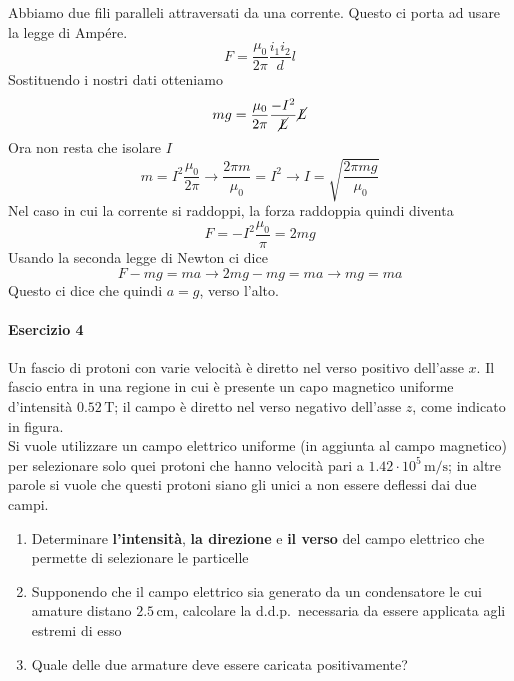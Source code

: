 Abbiamo due fili paralleli attraversati da una corrente. Questo ci porta ad usare la legge di Ampére.
\begin{equation*}
F = \frac{\mu_0}{2\pi}\frac{i_1i_2}{d}l
\end{equation*}
Sostituendo i nostri dati otteniamo
\begin{equation*}
mg = \frac{\mu_0}{2\pi}\frac{-I^2}{\cancel{L}}\cancel{L}
\end{equation*}
Ora non resta che isolare $I$
\begin{equation*}
m=I^2\frac{\mu_0}{2\pi} \rightarrow \frac{2\pi m}{\mu_0}=I^2 \rightarrow 
\boxed{I = \sqrt{\frac{2\pi mg}{\mu_0}}}
\end{equation*}
Nel caso in cui la corrente si raddoppi, la forza raddoppia quindi diventa
\begin{equation*}
F=-I^2\frac{\mu_0}{\pi}=2mg
\end{equation*}
Usando la seconda legge di Newton ci dice
\begin{equation*}
F-mg=ma\rightarrow 2mg-mg = ma \rightarrow mg=ma
\end{equation*}
Questo ci dice che quindi $\boxed{a = g}$, verso l'alto.

\paragraph{Esercizio 4}
Un fascio di protoni con varie velocità è diretto nel verso positivo dell'asse $x$. Il fascio
entra in una regione in cui è presente un capo magnetico uniforme d'intensità $0.52\,\text{T}$;
il campo è diretto nel verso negativo dell'asse $z$, come indicato in figura.\\
Si vuole utilizzare un campo elettrico uniforme (in aggiunta al campo magnetico) per selezionare
solo quei protoni che hanno velocità pari a $1.42\cdot10^5\,\text{m/s}$; in altre parole si
vuole che questi protoni siano gli unici a non essere deflessi dai due campi.
\begin{enumerate}
  \item Determinare \textbf{l'intensità},  \textbf{la direzione} e \textbf{il verso} del campo
    elettrico che permette di selezionare le particelle
  \item Supponendo che il campo elettrico sia generato da un condensatore le cui amature distano
    $2.5\,\text{cm}$, calcolare la d.d.p.~necessaria da essere applicata agli estremi di esso
  \item Quale delle due armature deve essere caricata positivamente?
\end{enumerate}

